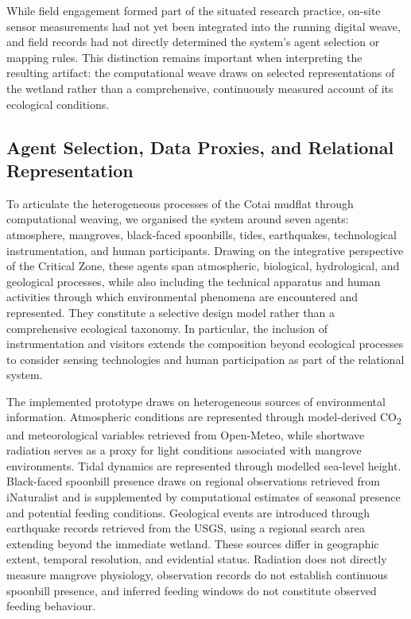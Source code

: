 \documentclass[manuscript,review,anonymous]{acmart}
\begin{document}
While field engagement formed part of the situated research practice, on-site sensor measurements had not yet been integrated into the running digital weave, and field records had not directly determined the system's agent selection or mapping rules. This distinction remains important when interpreting the resulting artifact: the computational weave draws on selected representations of the wetland rather than a comprehensive, continuously measured account of its ecological conditions.

\subsection{Agent Selection, Data Proxies, and Relational Representation}

To articulate the heterogeneous processes of the Cotai mudflat through computational weaving, we organised the system around seven agents: atmosphere, mangroves, black-faced spoonbills, tides, earthquakes, technological instrumentation, and human participants. Drawing on the integrative perspective of the Critical Zone, these agents span atmospheric, biological, hydrological, and geological processes, while also including the technical apparatus and human activities through which environmental phenomena are encountered and represented. They constitute a selective design model rather than a comprehensive ecological taxonomy. In particular, the inclusion of instrumentation and visitors extends the composition beyond ecological processes to consider sensing technologies and human participation as part of the relational system.

The implemented prototype draws on heterogeneous sources of environmental information. Atmospheric conditions are represented through model-derived CO\textsubscript{2} and meteorological variables retrieved from Open-Meteo, while shortwave radiation serves as a proxy for light conditions associated with mangrove environments. Tidal dynamics are represented through modelled sea-level height. Black-faced spoonbill presence draws on regional observations retrieved from iNaturalist and is supplemented by computational estimates of seasonal presence and potential feeding conditions. Geological events are introduced through earthquake records retrieved from the USGS, using a regional search area extending beyond the immediate wetland. These sources differ in geographic extent, temporal resolution, and evidential status. Radiation does not directly measure mangrove physiology, observation records do not establish continuous spoonbill presence, and inferred feeding windows do not constitute observed feeding behaviour.
\end{document}
